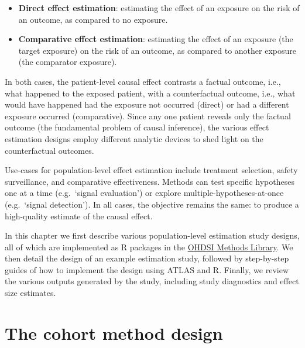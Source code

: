 \documentclass[11pt]{book}
\providecommand{\tightlist}{%
  \setlength{\itemsep}{0pt}\setlength{\parskip}{0pt}}
\theoremstyle{definition}
\theoremstyle{definition}
\theoremstyle{definition}
\theoremstyle{remark}
\begin{document}
\begin{itemize}
\tightlist
\item
  \textbf{Direct effect estimation}: estimating the effect of an exposure on the risk of an outcome, as compared to no exposure. 
\item
  \textbf{Comparative effect estimation}: estimating the effect of an exposure (the target exposure) on the risk of an outcome, as compared to another exposure (the comparator exposure). 
\end{itemize}

In both cases, the patient-level causal effect contrasts a factual outcome, i.e., what happened to the exposed patient, with a counterfactual outcome, i.e., what would have happened had the exposure not occurred (direct) or had a different exposure occurred (comparative). Since any one patient reveals only the factual outcome (the fundamental problem of causal inference), the various effect estimation designs employ different analytic devices to shed light on the counterfactual outcomes. 

Use-cases for population-level effect estimation include treatment selection, safety surveillance, and comparative effectiveness. Methods can test specific hypotheses one at a time (e.g.~`signal evaluation') or explore multiple-hypotheses-at-once (e.g.~`signal detection'). In all cases, the objective remains the same: to produce a high-quality estimate of the causal effect.  

In this chapter we first describe various population-level estimation study designs, all of which are implemented as R packages in the \href{https://ohdsi.github.io/MethodsLibrary/}{OHDSI Methods Library}. We then detail the design of an example estimation study, followed by step-by-step guides of how to implement the design using ATLAS and R. Finally, we review the various outputs generated by the study, including study diagnostics and effect size estimates.

\hypertarget{CohortMethod}{%
\section{The cohort method design}\label{CohortMethod}}

\end{document}
